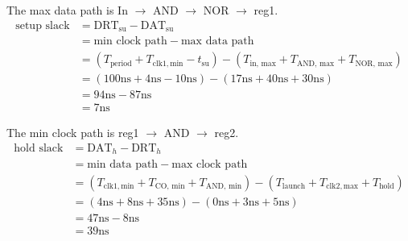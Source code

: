 \documentclass[12pt]{article}
\newenvironment{explanation}{\begin{tcolorbox}[colback=blue!2!white,colframe=blue!20!white]}{\end{tcolorbox}}
\newcommand{\dat}{\text{DAT}}
\newcommand{\drt}{\text{DRT}}
\newcommand{\clk}{\text{clk}}
\newcommand{\ns}{\text{ns}}
\begin{document}
    \section{}
        \begin{explanation}
            The max data path is In $\rightarrow$ AND $\rightarrow$ NOR $\rightarrow$ reg1.
            \begin{align*}
                \text{setup slack} &= \drt_{\text{su}} - \dat_\text{su} \\
                &= \text{min clock path} - \text{max data path} \\
                &= (T_\text{period} + T_{\clk 1, \text{min}} - t_{\text{su}}) - (T_{\text{in, max}} + T_{\text{AND, max}} + T_{\text{NOR, max}}) \\
                &= (100 \ns + 4 \ns - 10 \ns) - (17 \ns + 40 \ns + 30\ns) \\
                &= 94 \ns - 87 \ns \\
                &= 7 \ns
            \end{align*}

            The min clock path is reg1 $\rightarrow$ AND $\rightarrow$ reg2.
            \begin{align*}
                \text{hold slack} &= \dat_h - \drt_h \\
                &= \text{min data path} - \text{max clock path} \\
                &= (T_{\clk 1, \text{min}} + T_{\text{CO, min}} + T_{\text{AND, min}}) - (T_{\text{launch}} + T_{\clk 2, \text{max}} + T_{\text{hold}}) \\
                &= (4\ns + 8\ns + 35\ns) - (0 \ns + 3 \ns + 5\ns) \\
                &= 47 \ns - 8\ns \\
                &= 39 \ns
            \end{align*}
        \end{explanation}
\end{document}
